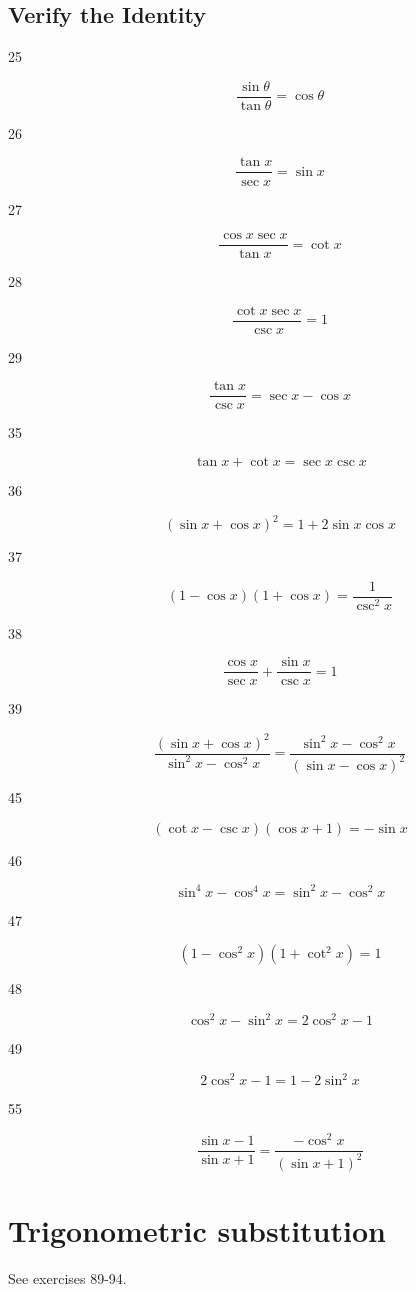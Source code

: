 \documentclass{exam}
\begin{document}
  \subsection{Verify the Identity}
  \begin{description}

    \item[25]
      \[
        \frac{\sin \theta}{\tan \theta} = \cos \theta
      \]

    \item[26]
      \[
        \frac{\tan x}{\sec x} = \sin x
      \]

    \item[27]
      \[
        \frac{\cos x \sec x}{\tan x} = \cot x
      \]

    \item[28]
      \[
        \frac{\cot x \sec x}{\csc x} = 1
      \]

    \item[29]
      \[
        \frac{\tan x}{\csc x} = \sec x - \cos x
      \]

    \item[35]
      \[
        \tan x + \cot x = \sec x \csc x
      \]

    \item[36]
      \[
        (\sin x + \cos x)^2 = 1 + 2 \sin x \cos x
      \]

    \item[37]
      \[
        (1 - \cos x)(1 + \cos x) = \frac{1}{\csc^2 x}
      \]

    \item[38]
      \[
        \frac{\cos x}{\sec x} + \frac{\sin x}{\csc x} = 1
      \]

    \item[39]
      \[
        \frac{(\sin x + \cos x)^2}{\sin^2 x - \cos^2 x} = \frac{\sin^2 x - \cos^2 x}{(\sin x - \cos x)^2}
      \]

    \item[45]
      \[
        (\cot x - \csc x)(\cos x + 1) = - \sin x
      \]

    \item[46]
      \[
        \sin^4 x - \cos^4 x = \sin^2 x - \cos^2 x
      \]

    \item[47]
      \[
        \left( 1 - \cos^2 x \right)\left( 1 + \cot^2 x \right) = 1
      \]

    \item[48]
      \[
        \cos^2 x - \sin^2 x = 2 \cos^2 x - 1
      \]

    \item[49]
      \[
        2 \cos^2 x - 1 = 1 - 2 \sin^2 x
      \]

    \item[55]
      \[
        \frac{\sin x - 1}{\sin x + 1} = \frac{- \cos^2 x}{(\sin x + 1)^2}
      \]

  \end{description}
  \section{Trigonometric substitution}
  See exercises 89-94.  
\end{document}
